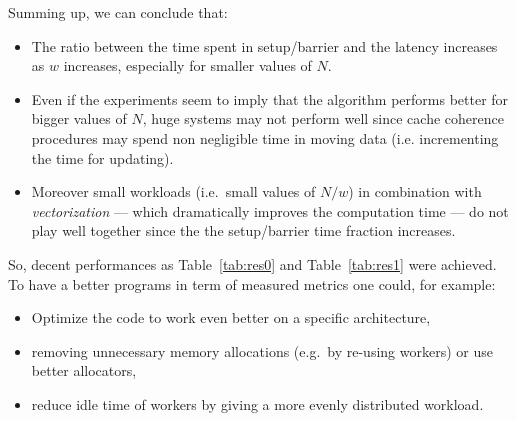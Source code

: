 Summing up, we can conclude that:
\begin{itemize}
	\item The ratio between the time spent in setup/barrier and the latency increases as $w$ increases, especially for smaller values of $N$.
	\item Even if the experiments seem to imply that the algorithm performs better for bigger values of $N$, huge systems may not perform well since cache coherence procedures may spend non negligible time in moving data (i.e. incrementing the time for updating).
	\item Moreover small workloads (i.e.\ small values of $N/w$) in combination with \emph{vectorization} --- which dramatically improves the computation time --- do not play well together since the the setup/barrier time fraction increases.
\end{itemize}

So, decent performances as Table~\ref{tab:res0} and Table~\ref{tab:res1} were achieved.
To have a better programs in term of measured metrics one could, for example:
\begin{itemize}
	\item Optimize the code to work even better on a specific architecture,
	\item removing unnecessary memory allocations (e.g.\ by re-using workers) or use better allocators,
	\item reduce idle time of workers by giving a more evenly distributed workload.
\end{itemize} 